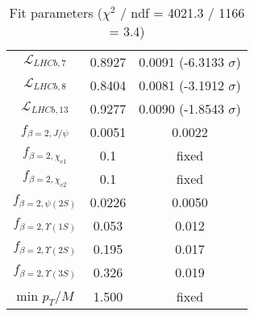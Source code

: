 \begin{table}[h!]
\begin{tabular}{c|c|c}
$\mathcal L_{LHCb,7}$ & 0.8927 & 0.0091 (-6.3133 $\sigma$) \\
$\mathcal L_{LHCb,8}$ & 0.8404 & 0.0081 (-3.1912 $\sigma$) \\
$\mathcal L_{LHCb,13}$ & 0.9277 & 0.0090 (-1.8543 $\sigma$) \\
$f_{\beta=2,J/\psi}$ & 0.0051 & 0.0022 \\
$f_{\beta=2,\chi_{c1}}$ & 0.1 & fixed \\
$f_{\beta=2,\chi_{c2}}$ & 0.1 & fixed \\
$f_{\beta=2,\psi(2S)}$ & 0.0226 & 0.0050 \\
$f_{\beta=2,\Upsilon(1S)}$ & 0.053 & 0.012 \\
$f_{\beta=2,\Upsilon(2S)}$ & 0.195 & 0.017 \\
$f_{\beta=2,\Upsilon(3S)}$ & 0.326 & 0.019 \\
min $p_T/M$ & 1.500 & fixed \\
\end{tabular}
\caption{Fit parameters ($\chi^2$ / ndf = 4021.3 / 1166 = 3.4)}
\end{table}
